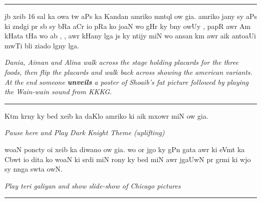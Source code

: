 \documentclass{article}
\begin{document}
\rule{\textwidth}{1pt}

jb xeib 16 sal ka owa tw aPs ka Kandan amriko mntql ow gia.
amriko jany sy aPs ki zndgi pr sb sy bRa aCr io pRa ko joaN wo gHr ky bny owUy , papR awr Am kHata tHa wo ab , , awr  kHany lga js ky ntijy miN wo ansan km awr aik antoaUi mwTi bli ziado lgny lga.

\begin{enpara}
	\itshape
	Dania, Aiman and Alina walk across the stage holding placards for the three foods, then flip the placards and walk back across showing the american variants. At the end someone \textbf{unveils} a poster of Shoaib's fat picture followed by playing the Wain-wain sound from KKKG.
\end{enpara}

\rule{\textwidth}{1pt}

 Ktm krny ky bed xeib ka daKlo amriko ki aik mxowr  miN ow gia.
\begin{enpara}
	\itshape
	Pause here and Play Dark Knight Theme (uplifting)
\end{enpara}

\vspace{0.5\baselineskip}
woaN poncty oi xeib  ka diwano ow gia.
wo or jgo  ky gPn gata awr  ki eVmt ka Cbwt io dita ko woaN ki srdi miN rony ky bed miN awr jgaUwN pr grmi ki wjo sy nnga swta owN. \hfill {}

\begin{enpara}
	\itshape
	Play teri galiyan and show slide-show of Chicago pictures
\end{enpara}

\rule{\textwidth}{1pt}
\end{document}
